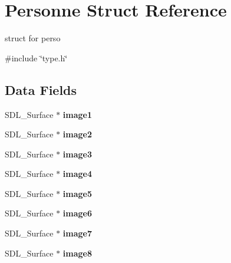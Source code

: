 \hypertarget{structPersonne}{}\section{Personne Struct Reference}
\label{structPersonne}


struct for perso  




{\ttfamily \#include \char`\"{}type.\+h\char`\"{}}

\subsection*{Data Fields}
\begin{DoxyCompactItemize}
\item 
S\+D\+L\+\_\+\+Surface $\ast$ {\bfseries image1}\hypertarget{structPersonne_a5ba6ae4971a61519fb5fb44c27416ba2}{}\label{structPersonne_a5ba6ae4971a61519fb5fb44c27416ba2}

\item 
S\+D\+L\+\_\+\+Surface $\ast$ {\bfseries image2}\hypertarget{structPersonne_abdb0a6b3b6f077d2ac6d93bce38950bd}{}\label{structPersonne_abdb0a6b3b6f077d2ac6d93bce38950bd}

\item 
S\+D\+L\+\_\+\+Surface $\ast$ {\bfseries image3}\hypertarget{structPersonne_a018b17557fcf0d8d21f6b24be4b1fa75}{}\label{structPersonne_a018b17557fcf0d8d21f6b24be4b1fa75}

\item 
S\+D\+L\+\_\+\+Surface $\ast$ {\bfseries image4}\hypertarget{structPersonne_a96d7128e0af43f1ee20893ebe7ec81d5}{}\label{structPersonne_a96d7128e0af43f1ee20893ebe7ec81d5}

\item 
S\+D\+L\+\_\+\+Surface $\ast$ {\bfseries image5}\hypertarget{structPersonne_a79f12b68dbbd5890d2178a94e6656d39}{}\label{structPersonne_a79f12b68dbbd5890d2178a94e6656d39}

\item 
S\+D\+L\+\_\+\+Surface $\ast$ {\bfseries image6}\hypertarget{structPersonne_aae809af7db85d2a70dcb486a2fe67368}{}\label{structPersonne_aae809af7db85d2a70dcb486a2fe67368}

\item 
S\+D\+L\+\_\+\+Surface $\ast$ {\bfseries image7}\hypertarget{structPersonne_ae9ae7943f9a0575983302f5bf26a5b5a}{}\label{structPersonne_ae9ae7943f9a0575983302f5bf26a5b5a}

\item 
S\+D\+L\+\_\+\+Surface $\ast$ {\bfseries image8}\hypertarget{structPersonne_abf531adac765ed47acef036040ed929a}{}\label{structPersonne_abf531adac765ed47acef036040ed929a}


\end{DoxyCompactItemize}

